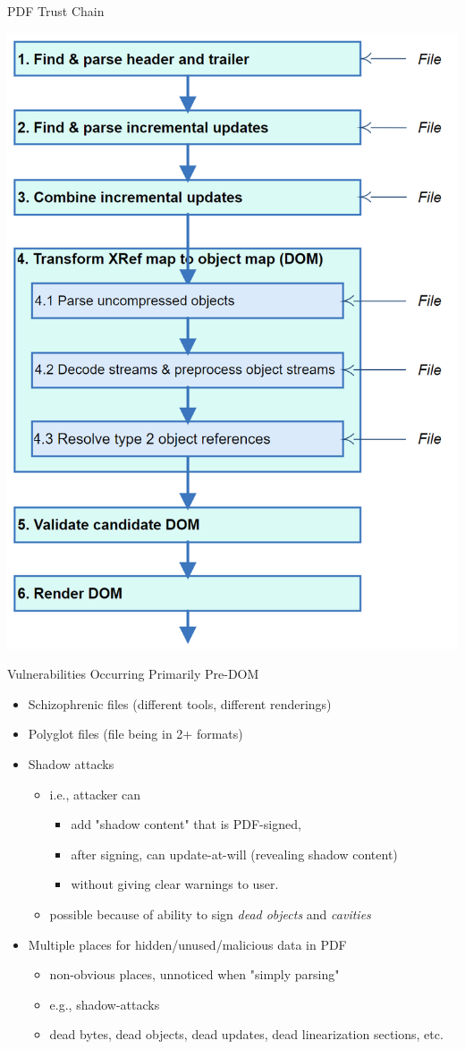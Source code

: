\documentclass[t,10pt,xcolor={dvipsnames}]{beamer}
\begin{document}
\begin{frame}[label={sec:orgea88b1d}]{PDF Trust Chain}
\begin{center}
\includegraphics[width=0.47\linewidth]{../figures/Stages.png}
\end{center}
\end{frame}

\begin{frame}[label={sec:org342d0d1}]{Vulnerabilities Occurring Primarily Pre-DOM}
\begin{itemize}
\item Schizophrenic files (different tools, different renderings)
\item Polyglot files (file being in 2+ formats)
\item Shadow attacks
\begin{itemize}
\item i.e., attacker can
\begin{itemize}
\item add "shadow content" that is PDF-signed,
\item after signing, can update-at-will (revealing shadow content)
\item without giving clear warnings to user.
\end{itemize}
\item possible because of ability to sign \emph{dead objects} and \emph{cavities}
\end{itemize}
\item Multiple places for hidden/unused/malicious data in PDF
\begin{itemize}
\item non-obvious places, unnoticed when "simply parsing"
\item e.g., shadow-attacks
\item dead bytes, dead objects, dead updates, dead linearization sections, etc.
\end{itemize}
\end{itemize}
\end{frame}
\end{document}
